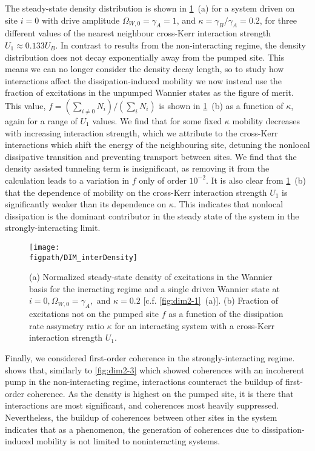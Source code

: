 The steady-state density distribution is shown in \cref{fig:dim3-2}~(a) for a system driven on site \(i=0\) with drive amplitude \(\Omega_{W,0} = \gamma_{A} = 1\), and \(\kappa = \gamma_{B}/\gamma_{A} = 0.2\), for three different values of the nearest neighbour cross-Kerr interaction strength \(U_{1} \approx 0.133U_{B}\). In contrast to results from the non-interacting regime, the density distribution does not decay exponentially away from the pumped site. This means we can no longer consider the density decay length, so to study how interactions affect the dissipation-induced mobility we now instead use the fraction of excitations in the unpumped Wannier states as the figure of merit. This value, \(f = (\sum_{i \neq 0} N_{i}) / (\sum_{i} N_{i})\) is shown in \cref{fig:dim3-2}~(b) as a function of \(\kappa\), again for a range of \(U_{1}\) values. We find that for some fixed \(\kappa\) mobility decreases with increasing interaction strength, which we attribute to the cross-Kerr interactions which shift the energy of the neighbouring site, detuning the nonlocal dissipative transition and preventing transport between sites. We find that the density assisted tunneling term is insignificant, as removing it from the calculation leads to a variation in \(f\) only of order \(10^{-2}\). It is also clear from \cref{fig:dim3-2}~(b) that the dependence of mobility on the cross-Kerr interaction strength \(U_{1}\) is significantly weaker than its dependence on \(\kappa\). This indicates that nonlocal dissipation is the dominant contributor in the steady state of the system in the strongly-interacting limit. 

\begin{figure}[ht!]
\centering 
\texttt{[image: \\figpath/DIM\_interDensity]}
\caption{\label{fig:dim3-2}(a) Normalized steady-state density of excitations in the Wannier basis for the ineracting regime and a single driven Wannier state at \(i=0, \Omega_{W,0} = \gamma_{A},\) and \(\kappa = 0.2\) [c.f. \cref{fig:dim2-1}~(a)]. (b) Fraction of excitations not on the pumped site \(f\) as a function of the dissipation rate assymetry ratio \(\kappa\) for an interacting system with a cross-Kerr interaction strength \(U_{1}\).}
\end{figure}

Finally, we considered first-order coherence in the strongly-interacting regime.  shows that, similarly to \cref{fig:dim2-3} which showed coherences with an incoherent pump in the non-interacting regime, interactions counteract the buildup of first-order coherence. As the density is highest on the pumped site, it is there that interactions are most significant, and coherences most heavily suppressed. Nevertheless, the buildup of coherences between other sites in the system indicates that as a phenomenon, the generation of coherences due to dissipation-induced mobility is not limited to noninteracting systems.

